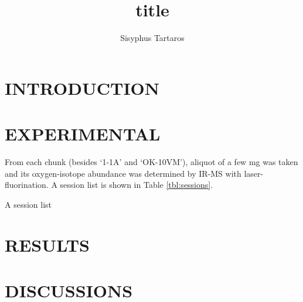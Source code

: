 \documentclass[12pt]{article}
\title{title}
\author{Sisyphus Tartaros}
\date{}
\begin{document}
\maketitle
\begin{abstract}
\end{abstract}
\tableofcontents
\section{INTRODUCTION}
\section{EXPERIMENTAL}
From each chunk (besides `1-1A' and `OK-10VM'), aliquot of a few mg
was taken and \cite{20140120174904-205862} its oxygen-isotope abundance was determined by IR-MS with laser-fluorination.
A session list is shown in Table \ref{tbl:sessions}.
\begin{table}[htdp]
  \begin{normalsize}
    \begin{center}
      \caption{A session list}
      \iffalse
      #+ORGTBL: SEND tbl:sessions orgtbl-to-latex :no-escape t
      |------+---------+-------+--------|
      | date | session | stone | remark |
      |------+---------+-------+--------|
      |      |         |       |        |
      |------+---------+-------+--------|
      \fi
      \label{tbl:sessions}
    \end{center}
  \end{normalsize}
\end{table}

\section{RESULTS}
\section{DISCUSSIONS}


\listoffigures
\listoftables
\end{document}
